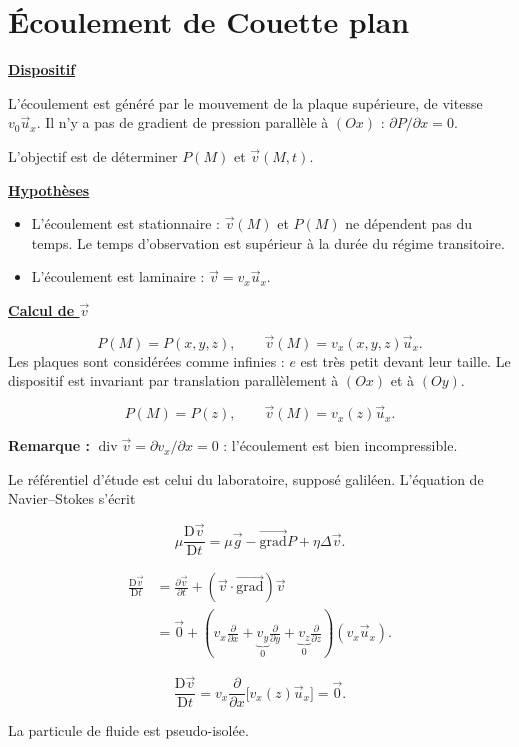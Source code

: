 \documentclass[11pt,a4paper]{article}
\newcommand{\grad}{\overrightarrow{\mathrm{grad}}}
\newcommand{\pd}[2]{\frac{\partial #1}{\partial #2}}
\newcommand{\ux}{\vec u_x}\newcommand{\uy}{\vec u_y}\newcommand{\uz}{\vec u_z}
\newcommand{\titr}[1]{\par\textbf{\underline{#1}}\par\nopagebreak[3]}
\newcommand{\Dv}{\frac{\mathrm D\vec v}{\mathrm Dt}}
\newcommand{\conv}{(\vec v\cdot\grad)\vec v}
\newcommand{\diver}{\operatorname{div}}
\begin{document}
\section{Écoulement de Couette plan}
\Needspace{100pt}\titr{Dispositif}
\begin{center}\end{center}
L'écoulement est généré par le mouvement de la plaque supérieure, de vitesse $v_0\ux$. Il n'y a pas de gradient de pression parallèle à $(Ox)$ : $\partial P/\partial x=0$.

L'objectif est de déterminer $P(M)$ et $\vec v(M,t)$.
\titr{Hypothèses}
\begin{itemize}
\item L'écoulement est stationnaire : $\vec v(M)$ et $P(M)$ ne dépendent pas du temps. Le temps d'observation est supérieur à la durée du régime transitoire.
\item L'écoulement est laminaire : $\vec v=v_x\ux$.
\end{itemize}
\titr{Calcul de $\vec v$}
\[P(M)=P(x,y,z),\qquad\vec v(M)=v_x(x,y,z)\ux.\]
Les plaques sont considérées comme infinies : $e$ est très petit devant leur taille. Le dispositif est invariant par translation parallèlement à $(Ox)$ et à $(Oy)$.
\begin{cadre}\[P(M)=P(z),\qquad\vec v(M)=v_x(z)\ux.\]\end{cadre}
\textbf{Remarque :} $\diver\vec v=\partial v_x/\partial x=0$ : l'écoulement est bien incompressible.

Le référentiel d'étude est celui du laboratoire, supposé galiléen. L'équation de Navier--Stokes s'écrit
\begin{cadre}\[\mu\Dv=\mu\vec g-\grad P+\eta\Delta\vec v.\]\end{cadre}
\begin{align*}
\Dv&=\pd{\vec v}{t}+\conv\\
&=\vec0+\left(v_x\frac\partial{\partial x}+\underbrace{v_y}_{0}\frac\partial{\partial y}+\underbrace{v_z}_{0}\frac\partial{\partial z}\right)(v_x\ux).
\end{align*}
\begin{cadre}\[\Dv=v_x\frac\partial{\partial x}\bigl[v_x(z)\ux\bigr]=\vec0.\]\end{cadre}
La particule de fluide est pseudo-isolée.
\end{document}
